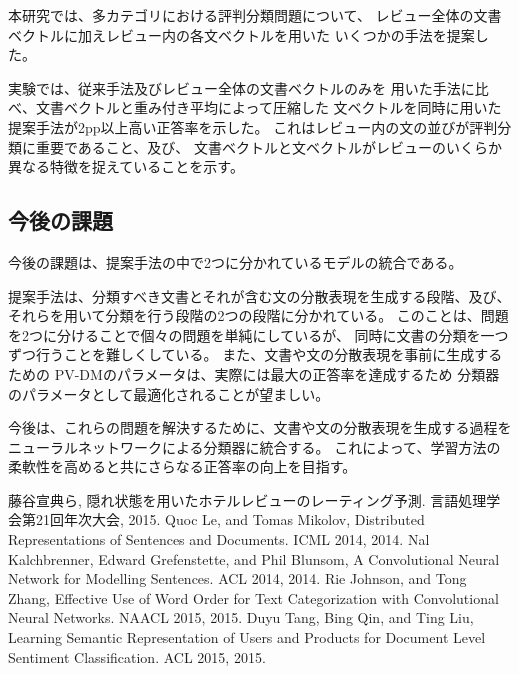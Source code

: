 \documentclass[twocolumn,a4paper]{ltjarticle}
\begin{document}
本研究では、多カテゴリにおける評判分類問題について、
レビュー全体の文書ベクトルに加えレビュー内の各文ベクトルを用いた
いくつかの手法を提案した。

実験では、従来手法\cite{fujitani15}及びレビュー全体の文書ベクトルのみを
用いた手法に比べ、文書ベクトルと重み付き平均によって圧縮した
文ベクトルを同時に用いた提案手法が2pp以上高い正答率を示した。
これはレビュー内の文の並びが評判分類に重要であること、及び、
文書ベクトルと文ベクトルがレビューのいくらか異なる特徴を捉えていることを示す。



\subsection{今後の課題}

今後の課題は、提案手法の中で2つに分かれているモデルの統合である。

提案手法は、分類すべき文書とそれが含む文の分散表現を生成する段階、及び、
それらを用いて分類を行う段階の2つの段階に分かれている。
このことは、問題を2つに分けることで個々の問題を単純にしているが、
同時に文書の分類を一つずつ行うことを難しくしている。
また、文書や文の分散表現を事前に生成するための
PV-DMのパラメータは、実際には最大の正答率を達成するため
分類器のパラメータとして最適化されることが望ましい。

今後は、これらの問題を解決するために、文書や文の分散表現を生成する過程を
ニューラルネットワークによる分類器に統合する。
これによって、学習方法の柔軟性を高めると共にさらなる正答率の向上を目指す。





\begin{thebibliography}{9}
  藤谷宣典ら,
  隠れ状態を用いたホテルレビューのレーティング予測.
  言語処理学会第21回年次大会, 2015.
  Quoc Le, and Tomas Mikolov,
  Distributed Representations of Sentences and Documents.
  ICML 2014, 2014.
  Nal Kalchbrenner, Edward Grefenstette, and Phil Blunsom,
  A Convolutional Neural Network for Modelling Sentences.
  ACL 2014, 2014.
  Rie Johnson, and Tong Zhang,
  Effective Use of Word Order for Text Categorization
  with Convolutional Neural Networks.
  NAACL 2015, 2015.
  Duyu Tang, Bing Qin, and Ting Liu,
  Learning Semantic Representation of Users and Products
  for Document Level Sentiment Classification.
  ACL 2015, 2015.
\end{thebibliography}
\end{document}
